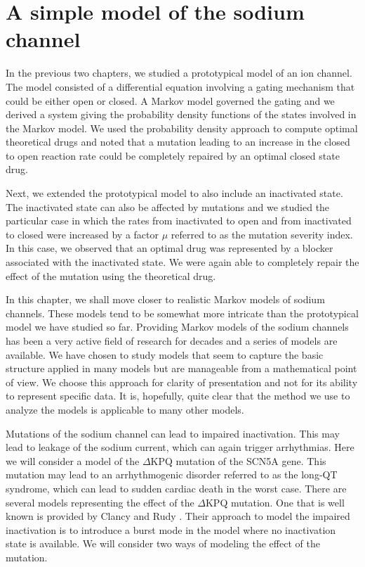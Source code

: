 

\chapter{A simple model of the sodium channel \label{simple_Na}}

In the previous two chapters, we studied a prototypical model of an ion
channel. The model consisted of a differential equation involving a gating
mechanism that could be either open or closed. A Markov model governed the
gating and we derived a system giving the probability density functions of
the states involved in the Markov model. We used the probability density
approach to compute optimal theoretical drugs and noted that a mutation
leading to an increase in the closed to open reaction rate could be completely
repaired by an optimal closed state drug.

Next, we extended the prototypical model to also include an inactivated state.
The inactivated state can also be affected by mutations and we studied the
particular case in which the rates from inactivated to open and from 
inactivated to closed were increased by a factor $\mu$ referred to as the 
mutation severity index. In this case, we observed that an optimal drug was 
represented by a blocker associated with the inactivated state. We were again
able to completely repair the effect of the mutation using the theoretical
 drug.

In this chapter, we shall move closer to realistic Markov models of sodium
channels. These models tend to be somewhat more intricate than the
prototypical model we have studied so far. Providing Markov models of the
sodium channels has been a very active field of research for decades and a
series of models are available. We have chosen to study models that seem to
capture the basic structure applied in many models but are manageable from a
mathematical point of view. We choose this approach for clarity of
presentation and not for its ability to represent specific data. It is,
hopefully, quite clear that the method we use to analyze the models is
applicable to many other models.

Mutations of the sodium channel can lead to impaired inactivation. This may
lead to leakage of the sodium current, which can again trigger arrhythmias.
Here we will consider a model of the $\Delta$KPQ mutation of the SCN5A gene.
This mutation may lead to an arrhythmogenic disorder referred to as the long-QT
syndrome, which can lead to sudden cardiac death in the worst case. There are
several models representing the effect of the $\Delta$KPQ mutation. 
One that is well known is
provided by Clancy and Rudy \cite{Clancy1999}. Their approach to model the
impaired inactivation is to introduce a burst mode in the model where no
inactivation state is available. We will consider two ways of modeling the
effect of the mutation.

